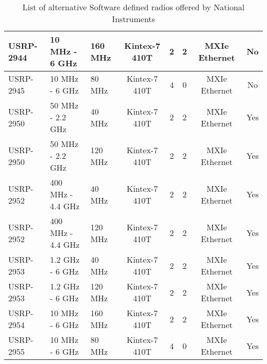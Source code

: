 \begin{sidewaystable}[htp]
\begin{center}
\begin{tabular}{|l|l|l|c|c|c|c|c|}
                USRP-2944      & 10 MHz - 6 GHz              & 160 MHz                               & Kintex-7 410T & 2               & 2                & MXIe Ethernet          & No                     \\ \hline
                USRP-2945      & 10 MHz - 6 GHz              & 80 MHz                                & Kintex-7 410T & 4               & 0                & MXIe Ethernet          & No                     \\ \hline
                USRP-2950      & 50 MHz - 2.2 GHz            & 40 MHz                                & Kintex-7 410T & 2               & 2                & MXIe Ethernet          & Yes                    \\ \hline
                USRP-2950      & 50 MHz - 2.2 GHz            & 120 MHz                               & Kintex-7 410T & 2               & 2                & MXIe Ethernet          & Yes                    \\ \hline
                USRP-2952      & 400 MHz - 4.4 GHz           & 40 MHz                                & Kintex-7 410T & 2               & 2                & MXIe Ethernet          & Yes                    \\ \hline
                USRP-2952      & 400 MHz - 4.4 GHz           & 120 MHz                               & Kintex-7 410T & 2               & 2                & MXIe Ethernet          & Yes                    \\ \hline
                USRP-2953      & 1.2 GHz - 6 GHz             & 40 MHz                                & Kintex-7 410T & 2               & 2                & MXIe Ethernet          & Yes                    \\ \hline
                USRP-2953      & 1.2 GHz - 6 GHz             & 120 MHz                               & Kintex-7 410T & 2               & 2                & MXIe Ethernet          & Yes                    \\ \hline
                USRP-2954      & 10 MHz - 6 GHz              & 160 MHz                               & Kintex-7 410T & 2               & 2                & MXIe Ethernet          & Yes                    \\ \hline
                USRP-2955      & 10 MHz - 6 GHz              & 80 MHz                                & Kintex-7 410T & 4               & 0                & MXIe Ethernet          & Yes                    \\ \hline
                \end{tabular}
            \end{center}
            \caption{List of alternative Software defined radios offered by National Instruments}
            \label{tb:USRPPartsList}
        \end{sidewaystable}


